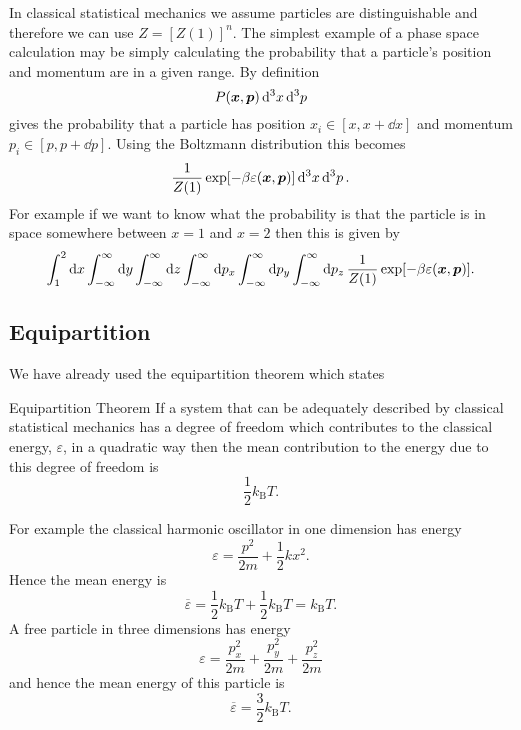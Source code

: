 \documentclass[a4paper]{article}
\newcommand{\boltzmann}{k_\mathrm{B}}
\newcommand{\mean}[1]{\overline{#1}}
\begin{document}
    In classical statistical mechanics we assume particles are distinguishable and therefore we can use \(Z = [Z(1)]^n\).
    The simplest example of a phase space calculation may be simply calculating the probability that a particle's position and momentum are in a given range.
    By definition
    \[P(\bm{x}, \bm{p})\dd[3]{x}\dd[3]{p}\]
    gives the probability that a particle has position \(x_i \in[x, x + \dd{x}]\) and momentum \(p_i \in[p, p + \dd{p}]\).
    Using the Boltzmann distribution this becomes
    \[\frac{1}{Z(1)}\exp[-\beta\varepsilon(\bm{x}, \bm{p})]\dd[3]{x}\dd[3]{p}.\]
    For example if we want to know what the probability is that the particle is in space somewhere between \(x = 1\) and \(x = 2\) then this is given by
    \[\int_1^2\dd{x}\int_{-\infty}^{\infty} \dd{y} \int_{-\infty}^{\infty} \dd{z} \int_{-\infty}^{\infty} \dd{p_x} \int_{-\infty}^{\infty} \dd{p_y} \int_{-\infty}^{\infty} \dd{p_z} \frac{1}{Z(1)}\exp[-\beta\varepsilon(\bm{x}, \bm{p})].\]
    
    \subsection{Equipartition}
    We have already used the equipartition theorem which states
    \begin{theorem*}{Equipartition Theorem}{}
        If a system that can be adequately described by classical statistical mechanics has a degree of freedom which contributes to the classical energy, \(\varepsilon\), in a quadratic way then the mean contribution to the energy due to this degree of freedom is
        \[\frac{1}{2}\boltzmann T.\]
    \end{theorem*}
    For example the classical harmonic oscillator in one dimension has energy
    \[\varepsilon = \frac{p^2}{2m} + \frac{1}{2}kx^2.\]
    Hence the mean energy is
    \[\mean{\varepsilon} = \frac{1}{2}\boltzmann T + \frac{1}{2}\boltzmann T = \boltzmann T.\]
    A free particle in three dimensions has energy
    \[\varepsilon = \frac{p_x^2}{2m} + \frac{p_y^2}{2m} + \frac{p_z^2}{2m}\]
    and hence the mean energy of this particle is
    \[\mean{\varepsilon} = \frac{3}{2}\boltzmann T.\]
    
\end{document}
